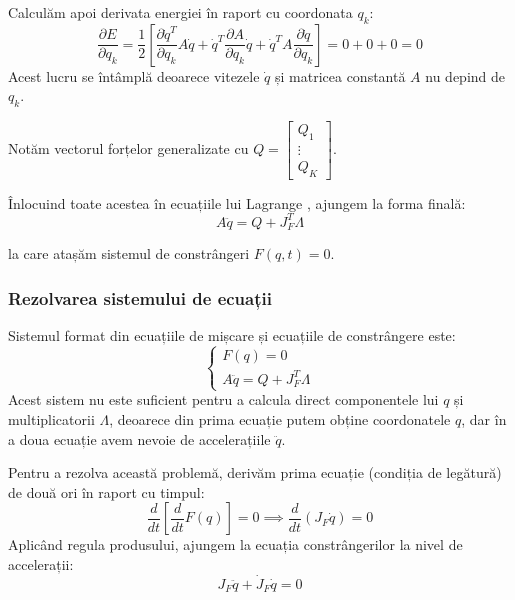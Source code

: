 \documentclass[12pt, a4paper]{article}
\begin{document}
Calculăm apoi derivata energiei în raport cu coordonata $q_k$:
\begin{equation}
    \frac{\partial E}{\partial q_k} = \frac{1}{2} \left[ \frac{\partial \dot{q}^T}{\partial q_k} A \dot{q} + \dot{q}^T \frac{\partial A}{\partial q_k} \dot{q} + \dot{q}^T A \frac{\partial \dot{q}}{\partial q_k} \right] = 0 + 0 + 0 = 0
\end{equation}
Acest lucru se întâmplă deoarece vitezele $\dot{q}$ și matricea constantă $A$ nu depind de $q_k$.

Notăm vectorul forțelor generalizate cu $Q = \begin{bmatrix} Q_1 \\ \vdots \\ Q_K \end{bmatrix}$. 

Înlocuind toate acestea în ecuațiile lui Lagrange , ajungem la forma finală:
\begin{equation}
    A\ddot{q} = Q + J_F^T \Lambda
\end{equation}

la care atașăm sistemul de constrângeri $F(q,t) = 0$.

\subsubsection{Rezolvarea sistemului de ecuații}

Sistemul format din ecuațiile de mișcare și ecuațiile de constrângere este:
\begin{equation}
    \begin{cases}
        F(q) = 0 \\
        A\ddot{q} = Q + J_F^T \Lambda
    \end{cases}
\end{equation}
Acest sistem nu este suficient pentru a calcula direct componentele lui $q$ și multiplicatorii $\Lambda$, deoarece din prima ecuație putem obține coordonatele $q$, dar în a doua ecuație avem nevoie de accelerațiile $\ddot{q}$.

Pentru a rezolva această problemă, derivăm prima ecuație (condiția de legătură) de două ori în raport cu timpul:
\begin{equation}
    \frac{d}{dt}\left[ \frac{d}{dt}F(q) \right] = 0 \implies \frac{d}{dt}(J_F \dot{q}) = 0
\end{equation}
Aplicând regula produsului, ajungem la ecuația constrângerilor la nivel de accelerații:
\begin{equation}
    J_F \ddot{q} + \dot{J}_F \dot{q} = 0
\end{equation}
\end{document}

